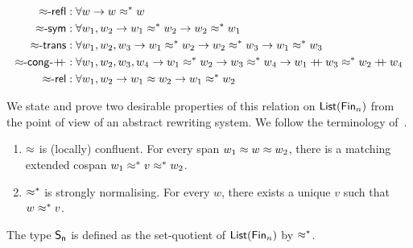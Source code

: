 \begin{definition}[$\cox*$]
  \begin{align*}
    \reflr{\cox}
     & : \forall w \to w \cox* w                                                                                                           \\
    \symr{\cox}
     & : \forall w_{1}, w_{2} \to w_{1} \cox* w_{2} \to w_{2} \cox* w_{1}                                                                  \\
    \transr{\cox}
     & : \forall w_{1}, w_{2}, w_{3} \to  w_{1} \cox* w_{2} \to w_{2} \cox* w_{3} \to w_{1} \cox* w_{3}                                    \\
    \congrf{\cox}{\append}
     & : \forall w_{1}, w_{2}, w_{3}, w_{4} \to  w_{1} \cox* w_{2} \to w_{3} \cox* w_{4} \to w_{1} \append w_{3} \cox* w_{2} \append w_{4} \\
    \relr{\cox}
     & : \forall w_{1}, w_{2} \to w_{1} \cox w_{2} \to w_{1} \cox* w_{2}                                                                   \\
  \end{align*}
\end{definition}


We state and prove two desirable properties of this relation on $\List[\Fin[n]]$ from the point of view of an abstract
rewriting system. We follow the terminology of~\cite{krausCoherenceWellFoundednessTaming2020}. 

\begin{proposition}
  \leavevmode
  \begin{enumerate}
    \item $\cox$ is (locally) confluent. For every span $w_{1} \cox w \cox w_{2}$, there is a matching extended cospan
          $w_{1} \cox* v \cox* w_{2}$.
    \item $\cox*$ is strongly normalising. For every $w$, there exists a unique $v$ such that $w \cox* v$.
  \end{enumerate}
\end{proposition}

The type $\Sn$ is defined as the set-quotient of $\List[\Fin[n]]$ by $\cox*$.

